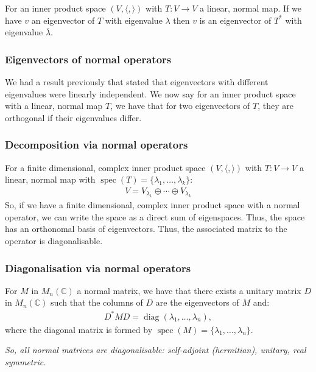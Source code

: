 \documentclass[a4paper, 12pt, twoside]{article}
\DeclareMathOperator{\Diag}{diag}
\DeclareMathOperator{\Spec}{spec}
\begin{document}
For an inner product space $(V, \langle , \rangle)$ with 
$T : V \to V$ a linear, normal map. If we have $v$ an eigenvector
of $T$ with eigenvalue $\lambda$ then $v$ is an eigenvector of $T^*$
with eigenvalue $\overline{\lambda}$.

\subsubsection{Eigenvectors of normal operators}

We had a result previously that stated that eigenvectors with
different eigenvalues were linearly independent. We now say for 
an inner product space with a linear, normal map $T$, we
have that for two eigenvectors of $T$, they are orthogonal if
their eigenvalues differ.

\subsubsection{Decomposition via normal operators}

For a finite dimensional, complex inner product space 
$(V, \langle , \rangle)$ with $T : V \to V$ a linear, normal map with
$\Spec(T) = \{\lambda_1, \ldots, \lambda_k\}$:
\begin{align*}
  V = V_{\lambda_1} \oplus \cdots \oplus V_{\lambda_k}
\end{align*}
So, if we have a finite dimensional, complex inner product 
space with a normal operator, we can write the space as a direct
sum of eigenspaces. Thus, the space has an orthonomal basis of eigenvectors.
Thus, the associated matrix to the operator is diagonalisable.

\subsubsection{Diagonalisation via normal operators}

For $M$ in $M_n(\mathbb{C})$ a normal matrix, we have that there
exists a unitary matrix $D$ in $M_n(\mathbb{C})$ such that the
columns of $D$ are the eigenvectors of $M$ and:
\begin{align*}
  D^*MD = \Diag(\lambda_1, \ldots, \lambda_n),
\end{align*}
where the diagonal matrix is formed by 
$\Spec(M) = \{\lambda_1, \ldots, \lambda_n\}$.

\vspace{\baselineskip}

\textit{So, all normal matrices are diagonalisable: 
self-adjoint (hermitian), unitary, real symmetric.}
\end{document}
